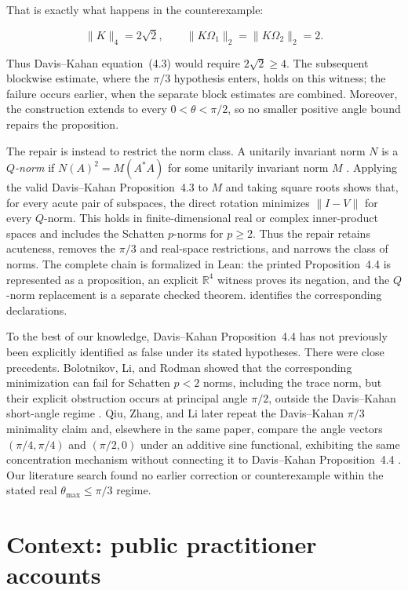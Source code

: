 \documentclass{article}
\begin{document}
That is exactly what happens in the counterexample:

$$
  \lVert K\rVert_4=2\sqrt{2},
  \qquad
  \lVert K\Omega_1\rVert_2
  =
  \lVert K\Omega_2\rVert_2
  =2.
$$

Thus Davis--Kahan equation~(4.3) would require $2\sqrt{2}\geq4$. The subsequent blockwise
estimate, where the $\pi/3$ hypothesis enters, holds on this witness; the
failure occurs earlier, when the separate block estimates are combined.
Moreover, the construction extends to every $0<\theta<\pi/2$, so no smaller
positive angle bound repairs the proposition.

The repair is instead to restrict the norm class. A unitarily invariant norm
$N$ is a \emph{$Q$-norm} if
$N(A)^2=M(A^*A)$ for some unitarily invariant norm $M$
\citep{bolotnikov2001minimal}. Applying the valid Davis--Kahan
Proposition~4.3 to $M$ and taking square roots shows that, for every acute pair
of subspaces, the direct rotation minimizes $\lVert I-V\rVert$ for every
$Q$-norm. This holds in finite-dimensional real or complex inner-product
spaces and includes the Schatten $p$-norms for $p\geq2$. Thus the repair
retains acuteness, removes the $\pi/3$ and real-space restrictions, and narrows
the class of norms.  The complete chain is formalized in Lean: the printed
Proposition~4.4 is represented as a proposition, an explicit $\mathbb R^4$
witness proves its negation, and the $Q$-norm replacement is a separate checked
theorem.   identifies the corresponding declarations.

To the best of our knowledge, Davis--Kahan Proposition~4.4 has not previously
been explicitly identified as false under its stated hypotheses. There were
close precedents. Bolotnikov, Li, and Rodman showed that the corresponding
minimization can fail for Schatten $p<2$ norms, including the trace norm, but
their explicit obstruction occurs at principal angle $\pi/2$, outside the
Davis--Kahan short-angle regime \citep{bolotnikov2001minimal}. Qiu, Zhang, and
Li later repeat the Davis--Kahan $\pi/3$ minimality claim and, elsewhere in the
same paper, compare the angle vectors $(\pi/4,\pi/4)$ and $(\pi/2,0)$ under an
additive sine functional, exhibiting the same concentration mechanism without
connecting it to Davis--Kahan Proposition~4.4 \citep{qiu2006grassmann}. Our
literature search found no earlier correction or counterexample within the
stated real $\theta_{\max}\leq\pi/3$ regime.


\section{Context: public practitioner accounts}
\label{sec:practitioner-accounts}
\end{document}
